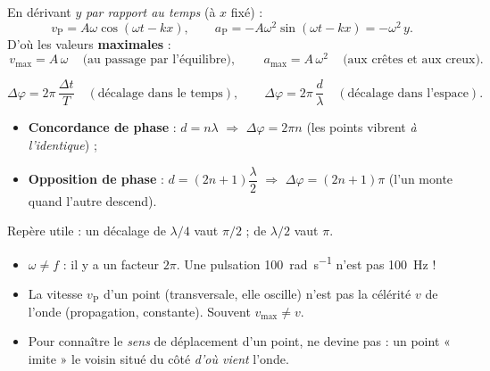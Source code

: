 \documentclass[11pt,a4paper]{article}
\begin{document}
\begin{cle}
En dérivant $y$ \emph{par rapport au temps} (à $x$ fixé) :
\[ v_{\mathrm P}=A\omega\cos(\omega t - kx),\qquad
   a_{\mathrm P}=-A\omega^{2}\sin(\omega t - kx)=-\omega^{2}\,y. \]
D'où les valeurs \textbf{maximales} :
\[ \boxed{\,v_{\max}=A\,\omega\,}\quad\text{(au passage par l'équilibre)},\qquad
   \boxed{\,a_{\max}=A\,\omega^{2}\,}\quad\text{(aux crêtes et aux creux)}. \]
\end{cle}

\begin{cle}
\[ \Delta\varphi = 2\pi\,\frac{\Delta t}{T}\quad(\text{décalage dans le temps}),
   \qquad
   \Delta\varphi = 2\pi\,\frac{d}{\lambda}\quad(\text{décalage dans l'espace}). \]
\begin{itemize}[leftmargin=1.4em,topsep=2pt,itemsep=1.5pt]
  \item \textbf{Concordance de phase} : $d=n\lambda$ $\Rightarrow$ $\Delta\varphi=2\pi n$
        (les points vibrent \emph{à l'identique}) ;
  \item \textbf{Opposition de phase} : $d=(2n+1)\dfrac{\lambda}{2}$ $\Rightarrow$
        $\Delta\varphi=(2n+1)\pi$ (l'un monte quand l'autre descend).
\end{itemize}
Repère utile : un décalage de $\lambda/4$ vaut $\pi/2$ ; de $\lambda/2$ vaut $\pi$.
\end{cle}

\begin{piege}
\begin{itemize}[leftmargin=1.4em,topsep=2pt,itemsep=1.5pt]
  \item $\omega\ne f$ : il y a un facteur $2\pi$. Une pulsation \SI{100}{\radian\per\second}
        n'est pas \SI{100}{\hertz} !
  \item La vitesse $v_{\mathrm P}$ d'un point (transversale, elle oscille) n'est pas la
        célérité $v$ de l'onde (propagation, constante). Souvent $v_{\max}\ne v$.
  \item Pour connaître le \emph{sens} de déplacement d'un point, ne devine pas :
        un point « imite » le voisin situé du côté \emph{d'où vient} l'onde.
\end{itemize}
\end{piege}
\end{document}
